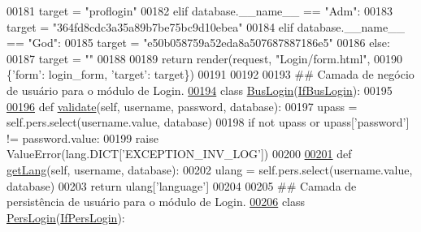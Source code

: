 \begin{DoxyCode}
00181                 target = \textcolor{stringliteral}{"proflogin"}
00182             \textcolor{keywordflow}{elif} database.\_\_name\_\_ == \textcolor{stringliteral}{"Adm"}:
00183                 target = \textcolor{stringliteral}{"364fd8cdc3a35a89b7be75bc9d10ebea"}
00184             \textcolor{keywordflow}{elif} database.\_\_name\_\_ == \textcolor{stringliteral}{"God"}:
00185                 target = \textcolor{stringliteral}{"e50b058759a52eda8a507687887186e5"}
00186             \textcolor{keywordflow}{else}:
00187                 target = \textcolor{stringliteral}{""}
00188 
00189             \textcolor{keywordflow}{return} render(request, \textcolor{stringliteral}{"Login/form.html"}, 
00190                 \{\textcolor{stringliteral}{'form'}: login\_form, \textcolor{stringliteral}{'target'}: target\})
00191 
00192 
00193 \textcolor{comment}{## Camada de negócio de usuário para o módulo de Login.}
\hypertarget{LoginUnit_8py_source_l00194}{}\hyperlink{classLogin_1_1LoginUnit_1_1BusLogin}{00194} \textcolor{keyword}{class }\hyperlink{classLogin_1_1LoginUnit_1_1BusLogin}{BusLogin}(\hyperlink{classLogin_1_1LoginUnit_1_1IfBusLogin}{IfBusLogin}):
00195 
\hypertarget{LoginUnit_8py_source_l00196}{}\hyperlink{classLogin_1_1LoginUnit_1_1BusLogin_a88b18ffaeaa3a53934aa38338de3b1c0}{00196}     \textcolor{keyword}{def }\hyperlink{classLogin_1_1LoginUnit_1_1BusLogin_a88b18ffaeaa3a53934aa38338de3b1c0}{validate}(self, username, password, database):
00197         upass = self.pers.select(username.value, database)
00198         \textcolor{keywordflow}{if} \textcolor{keywordflow}{not} upass \textcolor{keywordflow}{or} upass[\textcolor{stringliteral}{'password'}] != password.value:
00199             \textcolor{keywordflow}{raise} ValueError(lang.DICT[\textcolor{stringliteral}{'EXCEPTION\_INV\_LOG'}])
00200 
\hypertarget{LoginUnit_8py_source_l00201}{}\hyperlink{classLogin_1_1LoginUnit_1_1BusLogin_a5f4d3b7661b5061dc8a51c55f34ab169}{00201}     \textcolor{keyword}{def }\hyperlink{classLogin_1_1LoginUnit_1_1BusLogin_a5f4d3b7661b5061dc8a51c55f34ab169}{getLang}(self, username, database):
00202         ulang = self.pers.select(username.value, database)
00203         \textcolor{keywordflow}{return} ulang[\textcolor{stringliteral}{'language'}]
00204 
00205 \textcolor{comment}{## Camada de persistência de usuário para o módulo de Login.}
\hypertarget{LoginUnit_8py_source_l00206}{}\hyperlink{classLogin_1_1LoginUnit_1_1PersLogin}{00206} \textcolor{keyword}{class }\hyperlink{classLogin_1_1LoginUnit_1_1PersLogin}{PersLogin}(\hyperlink{classLogin_1_1LoginUnit_1_1IfPersLogin}{IfPersLogin}):

\end{DoxyCode}
